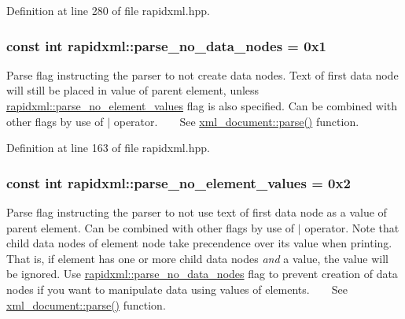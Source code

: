 Definition at line 280 of file rapidxml.\+hpp.

\subsubsection[{\texorpdfstring{parse\+\_\+no\+\_\+data\+\_\+nodes}{parse_no_data_nodes}}]{\setlength{\rightskip}{0pt plus 5cm}const int rapidxml\+::parse\+\_\+no\+\_\+data\+\_\+nodes = 0x1}\hypertarget{namespacerapidxml_ac2d21ef14a4e8936b94aca5d38b1a74d}{}\label{namespacerapidxml_ac2d21ef14a4e8936b94aca5d38b1a74d}
Parse flag instructing the parser to not create data nodes. Text of first data node will still be placed in value of parent element, unless \hyperlink{namespacerapidxml_a00e6fea134b786ea6efeed1c8bc4a668}{rapidxml\+::parse\+\_\+no\+\_\+element\+\_\+values} flag is also specified. Can be combined with other flags by use of $\vert$ operator. ~\newline
~\newline
 See \hyperlink{classrapidxml_1_1xml__document_ac6e73ff9ac323bf5a370c38feb03a6b1}{xml\+\_\+document\+::parse()} function. 

Definition at line 163 of file rapidxml.\+hpp.

\subsubsection[{\texorpdfstring{parse\+\_\+no\+\_\+element\+\_\+values}{parse_no_element_values}}]{\setlength{\rightskip}{0pt plus 5cm}const int rapidxml\+::parse\+\_\+no\+\_\+element\+\_\+values = 0x2}\hypertarget{namespacerapidxml_a00e6fea134b786ea6efeed1c8bc4a668}{}\label{namespacerapidxml_a00e6fea134b786ea6efeed1c8bc4a668}
Parse flag instructing the parser to not use text of first data node as a value of parent element. Can be combined with other flags by use of $\vert$ operator. Note that child data nodes of element node take precendence over its value when printing. That is, if element has one or more child data nodes {\itshape and} a value, the value will be ignored. Use \hyperlink{namespacerapidxml_ac2d21ef14a4e8936b94aca5d38b1a74d}{rapidxml\+::parse\+\_\+no\+\_\+data\+\_\+nodes} flag to prevent creation of data nodes if you want to manipulate data using values of elements. ~\newline
~\newline
 See \hyperlink{classrapidxml_1_1xml__document_ac6e73ff9ac323bf5a370c38feb03a6b1}{xml\+\_\+document\+::parse()} function. 

